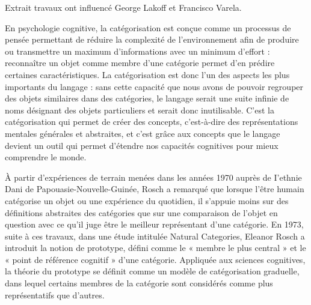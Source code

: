 \begin{lecture}{Extrait}
travaux ont influencé George Lakoff et Francisco Varela. 

 En psychologie cognitive, la catégorisation est conçue comme un processus de pensée permettant de réduire la complexité de l’environnement afin de produire ou transmettre un maximum d’informations avec un minimum d’effort : reconnaître un objet comme membre d’une catégorie permet d’en prédire certaines caractéristiques. La catégorisation est donc l’un des aspects les plus importants du langage : sans cette capacité que nous avons de pouvoir regrouper des objets similaires dans des catégories, le langage serait une suite infinie de noms désignant des objets particuliers et serait donc inutilisable. C’est la catégorisation qui permet de créer des concepts, c’est-à-dire des représentations mentales générales et abstraites, et c’est grâce aux concepts que le langage devient un outil qui permet d’étendre nos capacités cognitives pour mieux comprendre le monde.
\end{lecture}
 À partir d’expériences de terrain menées dans les années 1970 auprès de I’ethnie Dani de Papouasie-Nouvelle-Guinée, Rosch a remarqué que lorsque l’être humain catégorise un objet ou une expérience du quotidien, il s’appuie moins sur des définitions abstraites des catégories que sur une comparaison de l’objet en question avec ce qu’il juge être le meilleur représentant d’une catégorie. En 1973, suite à ces travaux, dans une étude intitulée Natural Categories, Eleanor Rosch a introduit la notion de prototype, défini comme le « membre le plus central » et le « point de référence cognitif » d’une catégorie. Appliquée aux sciences cognitives, la théorie du prototype se définit comme un modèle de catégorisation graduelle, dans lequel certains membres de la catégorie sont considérés comme plus représentatifs que d’autres.\par




